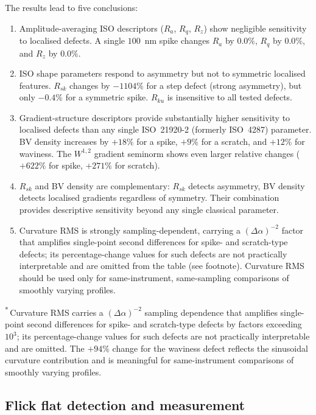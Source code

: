 \documentclass[review]{elsarticle}
\begin{document}
The results lead to five conclusions:
\begin{enumerate}
  \item Amplitude-averaging ISO descriptors ($R_a$, $R_q$, $R_z$) show negligible sensitivity to localised defects. A single $100$~nm spike changes $R_a$ by $0.0\%$, $R_q$ by $0.0\%$, and $R_z$ by $0.0\%$.
  \item ISO shape parameters respond to asymmetry but not to symmetric localised features. $R_{sk}$ changes by $-1104\%$ for a step defect (strong asymmetry), but only $-0.4\%$ for a symmetric spike. $R_{ku}$ is insensitive to all tested defects.
  \item Gradient-structure descriptors provide substantially higher sensitivity to localised defects than any single ISO~21920-2 (formerly ISO~4287) parameter. BV density increases by $+18\%$ for a spike, $+9\%$ for a scratch, and $+12\%$ for waviness. The $W^{1,2}$ gradient seminorm shows even larger relative changes ($+622\%$ for spike, $+271\%$ for scratch).
  \item $R_{sk}$ and BV density are complementary: $R_{sk}$ detects asymmetry, BV density detects localised gradients regardless of symmetry. Their combination provides descriptive sensitivity beyond any single classical parameter.
  \item Curvature RMS is strongly sampling-dependent, carrying a $(\Delta\alpha)^{-2}$ factor that amplifies single-point second differences for spike- and scratch-type defects; its percentage-change values for such defects are not practically interpretable and are omitted from the table (see footnote). Curvature RMS should be used only for same-instrument, same-sampling comparisons of smoothly varying profiles.
\end{enumerate}


\textsuperscript{*}\,Curvature RMS carries a $(\Delta\alpha)^{-2}$ sampling dependence that amplifies single-point second differences for spike- and scratch-type defects by factors exceeding $10^3$; its percentage-change values for such defects are not practically interpretable and are omitted. The $+94\%$ change for the waviness defect reflects the sinusoidal curvature contribution and is meaningful for same-instrument comparisons of smoothly varying profiles.


\subsection{Flick flat detection and measurement}
\end{document}
